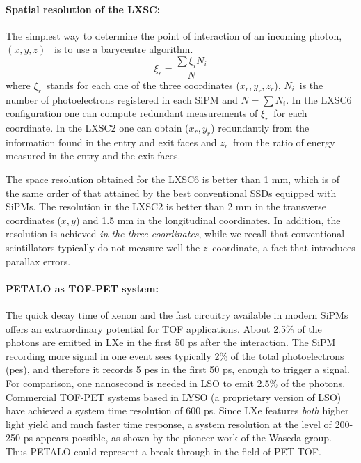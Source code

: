 
\paragraph{Spatial resolution of the LXSC:}
The simplest way to determine the point of interaction of an incoming photon, $(x,y,z)$~ is to use a barycentre algorithm. 
\[
\xi_r = \frac{\sum \xi_i N_i}{N}
\]
where $\xi_r$~stands for each one of the three coordinates ($x_r, y_r, z_r$), $N_i$~is the number of photoelectrons registered in each SiPM and $N=\sum N_i$. In the LXSC6  configuration one can compute redundant measurements of $\xi_r$~for each coordinate. In the  LXSC2 one can obtain ($x_r,y_r$) redundantly from the information found in the entry and exit faces and $z_r$~from the ratio of energy measured in the entry and the exit faces. 

The space resolution obtained for the LXSC6 is better than 1 mm, which is of the same order of that attained by the best conventional SSDs equipped with SiPMs. The resolution in the LXSC2 is better than 2 mm in the transverse coordinates ($x,y$) and 1.5 mm in the longitudinal coordinates.  In addition, the resolution is achieved {\em in the three coordinates}, while we recall that conventional scintillators typically do not measure well the $z$~coordinate, a fact that introduces parallax errors. 


\paragraph{PETALO as TOF-PET system:}


The quick decay time of xenon and the fast circuitry available in modern SiPMs offers an extraordinary potential for TOF applications. About 2.5\% of the photons are emitted in LXe in the first 50 ps after the interaction. The SiPM recording more signal in one event sees typically  2\% of the total photoelectrons (pes), and therefore it records 5 pes in the first 50 ps, enough to trigger a signal. For comparison, one nanosecond is needed in LSO to emit 2.5\% of the photons. Commercial TOF-PET systems based in LYSO (a proprietary version of LSO) have achieved a system time resolution of 600 ps. Since LXe features {\em both} higher light yield and much faster time response, a system resolution at the level of 200-250 ps appears possible, as shown by the pioneer work of the Waseda group. Thus PETALO could represent a break through in the field of PET-TOF. 


